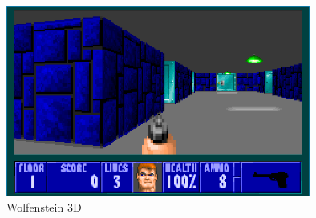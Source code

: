 \documentclass[a4paper,12pt]{report}
\begin{document}
\begin{figure}[htbp] 
        \centering
        \includegraphics[width=10cm]{wolf3d.png} 
		\caption{Wolfenstein 3D}
\end{figure}
\end{document}
